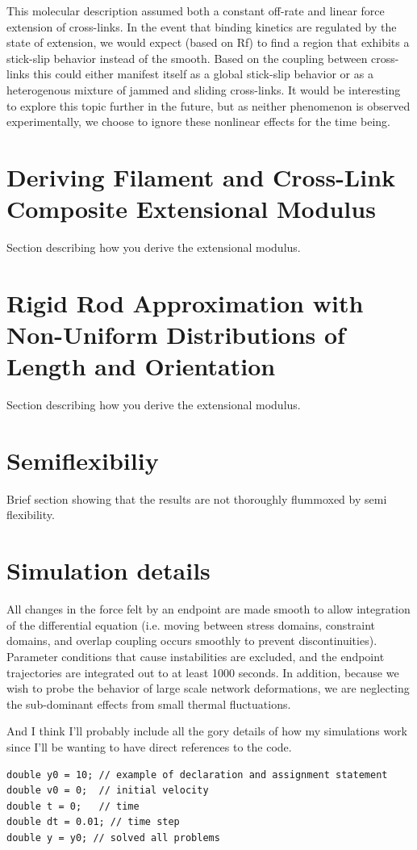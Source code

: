 \documentclass[pre,reprint]{revtex4-1}
\begin{document}
This molecular description assumed both a constant off-rate and linear force extension of cross-links.  In the event that binding kinetics are regulated by the state of extension, we would expect (based on Rf) to find a region that exhibits a stick-slip behavior instead of the smooth.  Based on the coupling between cross-links this could either manifest itself as a global stick-slip behavior or as a heterogenous mixture of jammed and sliding cross-links.  It would be interesting to explore this topic further in the future, but as neither phenomenon is observed experimentally, we choose to ignore these nonlinear effects for the time being.

\section{Deriving Filament and Cross-Link Composite Extensional Modulus}
\label{app:compos}
Section describing how you derive the extensional modulus.

\section{Rigid Rod Approximation with Non-Uniform Distributions of Length and Orientation}
\label{app:aargh}
Section describing how you derive the extensional modulus.



\section{Semiflexibiliy}

Brief section showing that the results are not thoroughly flummoxed by semi flexibility.


\section{Simulation details}

All changes in the force felt by an endpoint are made smooth to allow integration of the differential equation (i.e. moving between stress domains, constraint domains, and overlap coupling occurs smoothly to prevent discontinuities).  Parameter conditions that cause instabilities are excluded, and the endpoint trajectories are integrated out to at least 1000 seconds. In addition, because we wish to probe the behavior of large scale network deformations, we are neglecting the sub-dominant effects from small thermal fluctuations. 


And I think I'll probably include all the gory details of how my simulations work since I'll be wanting to have direct references to the code. 
\begin{verbatim}
double y0 = 10; // example of declaration and assignment statement
double v0 = 0;  // initial velocity
double t = 0;   // time
double dt = 0.01; // time step
double y = y0; // solved all problems
\end{verbatim}



\end{document}
